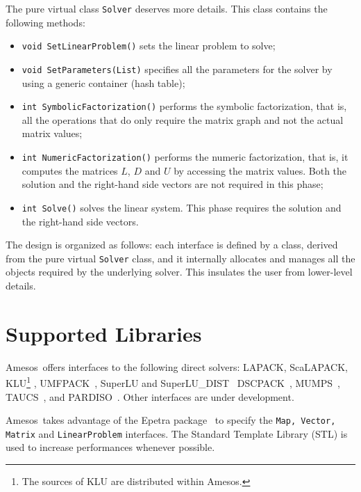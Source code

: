 \documentclass{llncs}
\newcommand{\amesos}{{\sc Amesos}}
\begin{document}
The pure virtual class {\tt Solver} deserves more details. This class contains
the following methods:
\begin{itemize}
\item
\verb!void SetLinearProblem()! sets the linear problem
to solve;
\item
\verb!void SetParameters(List)! specifies all the parameters for the solver by
using a generic container (hash table);
\item
\verb!int SymbolicFactorization()! performs the symbolic factorization, that
is, all the operations that do only require the matrix graph and not the
actual matrix values;
\item
\verb!int NumericFactorization()! performs the numeric factorization, that
is, it computes the matrices $L$, $D$ and $U$ by accessing the matrix values.
Both the solution and the right-hand side vectors are not required in this phase;
\item
\verb!int Solve()! solves the linear system. This phase requires the
solution and the right-hand side vectors.
\end{itemize}

The design is organized
as follows: each interface is defined by a class, derived from the
pure virtual {\tt Solver} class, and it internally allocates and manages all
the objects required by the underlying solver. This insulates the user from
lower-level details. 

\section{Supported Libraries}
\label{sec:supported}

\amesos\ offers interfaces to the following direct solvers: LAPACK, ScaLAPACK,
KLU\footnote{The sources of KLU are distributed within \amesos.}
\cite{davis05klu}, UMFPACK~\cite{umfpack-home-page}, SuperLU and
SuperLU\_DIST~\cite{superlu-manual} DSCPACK~\cite{dscpack-manual},
MUMPS~\cite{mumps-manual}, TAUCS~\cite{irony04parallel}, and
PARDISO~\cite{oskl:04-etna,sg:04-fgcs}. Other interfaces are under
development.

\amesos\ takes advantage of the {\sc Epetra} package~\cite{Epetra-Ref-Guide}
to specify the {\tt Map, Vector, Matrix} and {\tt LinearProblem} interfaces.
The Standard Template Library (STL) is used to increase performances
whenever possible.
\end{document}
